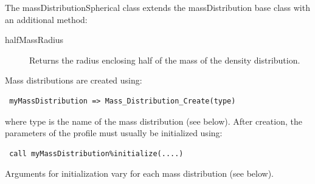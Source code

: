 The {\normalfont \ttfamily massDistributionSpherical} class extends the {\normalfont \ttfamily massDistribution} base class with an additional method:
\begin{description}
 \item [{\normalfont \ttfamily halfMassRadius}] Returns the radius enclosing half of the mass of the density distribution.
\end{description}

Mass distributions are created using:
\begin{verbatim}
 myMassDistribution => Mass_Distribution_Create(type)
\end{verbatim}
where {\normalfont \ttfamily type} is the name of the mass distribution (see below). After creation, the parameters of the profile must usually be initialized using:
\begin{verbatim}
 call myMassDistribution%initialize(....)
\end{verbatim}
Arguments for initialization vary for each mass distribution (see below).

